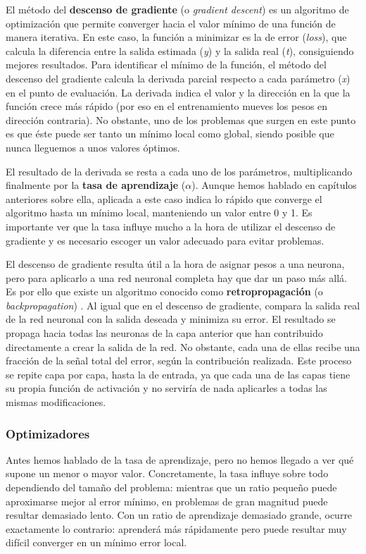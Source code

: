 El método del \textbf{descenso de gradiente} (o \textit{gradient descent}) \citep[cap. 2]{Buduma:general} es un algoritmo de optimización que permite converger hacia el valor mínimo de una función de manera iterativa. En este caso, la función a minimizar es la de error (\textit{loss}), que calcula la diferencia entre la salida estimada (\textit{y}) y la salida real (\textit{t}), consiguiendo mejores resultados. Para identificar el mínimo de la función, el método del descenso del gradiente calcula la derivada parcial respecto a cada parámetro (\textit{x}) en el punto de evaluación. La derivada indica el valor y la dirección en la que la función crece más rápido (por eso en el entrenamiento mueves los pesos en dirección contraria). No obstante, uno de los problemas que surgen en este punto es que éste puede ser tanto un mínimo local como global, siendo posible que nunca lleguemos a unos valores óptimos.

El resultado de la derivada se resta a cada uno de los parámetros, multiplicando finalmente por la \textbf{tasa de aprendizaje} ($\alpha$). Aunque hemos hablado en capítulos anteriores sobre ella, aplicada a este caso indica lo rápido que converge el algoritmo hasta un mínimo local, manteniendo un valor entre 0 y 1. Es importante ver que la tasa influye mucho a la hora de utilizar el descenso de gradiente y es necesario escoger un valor adecuado para evitar problemas. 

El descenso de gradiente resulta útil a la hora de asignar pesos a una neurona, pero para aplicarlo a una red neuronal completa hay que dar un paso más allá. Es por ello que existe un algoritmo conocido como \textbf{retropropagación} (o \textit{backpropagation}) \citep[cap. 2]{Buduma:general}. Al igual que en el descenso de gradiente, compara la salida real de la red neuronal con la salida deseada y minimiza su error. El resultado se propaga hacia todas las neuronas de la capa anterior que han contribuido directamente a crear la salida de la red. No obstante, cada una de ellas recibe una fracción de la señal total del error, según la contribución realizada. Este proceso se repite capa por capa, hasta la de entrada, ya que cada una de las capas tiene su propia función de activación y no serviría de nada aplicarles a todas las mismas modificaciones.

\subsubsection{Optimizadores}
Antes hemos hablado de la tasa de aprendizaje, pero no hemos llegado a ver qué supone un menor o mayor valor. Concretamente, la tasa influye sobre todo dependiendo del tamaño del problema: mientras que un ratio pequeño puede aproximarse mejor al error mínimo, en problemas de gran magnitud puede resultar demasiado lento. Con un ratio de aprendizaje demasiado grande, ocurre exactamente lo contrario: aprenderá más rápidamente pero puede resultar muy difícil converger en un mínimo error local. 

